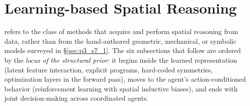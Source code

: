 
\section{Learning-based Spatial Reasoning}
\label{sec:p3_s7_2}

 refers to the class of methods that acquire and perform spatial reasoning from data, rather than from the hand-authored geometric, mechanical, or symbolic models surveyed in §\ref{sec:p3_s7_1}.
The six subsections that follow are ordered by the \emph{locus of the structural prior}: it begins inside the learned representation (latent feature interaction, explicit programs, hard-coded symmetries, optimization layers in the forward pass), moves to the agent's action-conditioned behavior (reinforcement learning with spatial inductive biases), and ends with joint decision-making across coordinated agents.



















